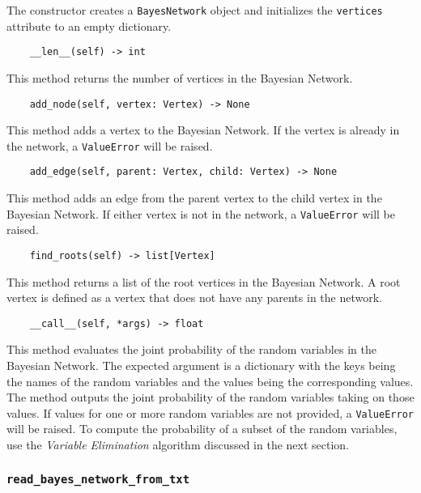 \documentclass{article}
\theoremstyle{definition}
\begin{document}
The constructor creates a \texttt{BayesNetwork} object and initializes the \texttt{vertices} attribute to an empty dictionary.

\begin{verbatim}
    __len__(self) -> int
\end{verbatim}

This method returns the number of vertices in the Bayesian Network.

\begin{verbatim}
    add_node(self, vertex: Vertex) -> None
\end{verbatim}

This method adds a vertex to the Bayesian Network. If the vertex is already in the network, a \texttt{ValueError} will be raised.

\begin{verbatim}
    add_edge(self, parent: Vertex, child: Vertex) -> None
\end{verbatim}

This method adds an edge from the parent vertex to the child vertex in the Bayesian Network. If either vertex is not in the network, a \texttt{ValueError} will be raised.

\begin{verbatim}
    find_roots(self) -> list[Vertex]
\end{verbatim}

This method returns a list of the root vertices in the Bayesian Network. A root vertex is defined as a vertex that does not have any parents in the network.

\begin{verbatim}
    __call__(self, *args) -> float
\end{verbatim}

This method evaluates the joint probability of the random variables in the Bayesian Network. The expected argument is a dictionary with the keys being the names of the random variables and the values being the corresponding values. The method outputs the joint probability of the random variables taking on those values. If values for one or more random variables are not provided, a \texttt{ValueError} will be raised. To compute the probability of a subset of the random variables, use the \textit{Variable Elimination} algorithm discussed in the next section.

\subsubsection{\texttt{read\_bayes\_network\_from\_txt}}
\end{document}
